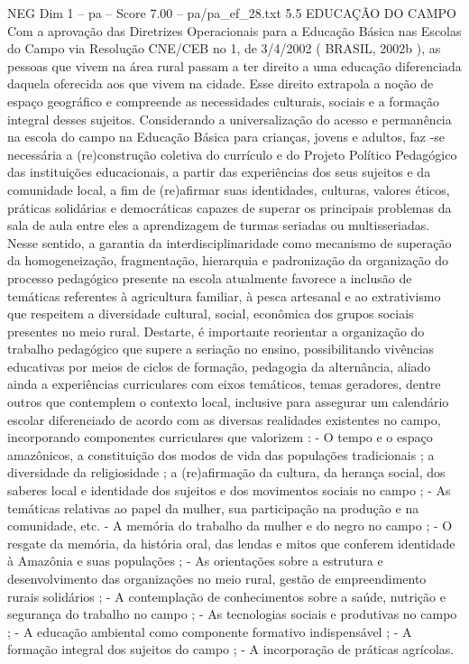 \begin{textsample}{NEG Dim 1 – pa – Score 7.00 – pa/pa\_ef\_28.txt}  \label{ex:f1_neg_260}
5.5 EDUCAÇÃO DO CAMPO Com a aprovação das Diretrizes Operacionais para a Educação Básica nas Escolas do Campo via Resolução CNE/CEB no 1, de 3/4/2002 ( BRASIL, 2002b ), as pessoas que vivem na área rural passam a ter direito a uma educação diferenciada daquela oferecida aos que vivem na cidade.
Esse direito extrapola a noção de espaço geográfico e compreende as necessidades culturais, sociais e a formação integral desses sujeitos.
Considerando a universalização do acesso e permanência na escola do campo na Educação Básica para crianças, jovens e adultos, faz -se necessária a (re)construção coletiva do currículo e do Projeto Político Pedagógico das instituições educacionais, a partir das experiências dos seus sujeitos e da comunidade local, a fim de (re)afirmar suas identidades, culturas, valores éticos, práticas solidárias e democráticas capazes de superar os principais problemas da sala de aula entre eles a aprendizagem de turmas seriadas ou multisseriadas.
Nesse sentido, a garantia da interdisciplinaridade como mecanismo de superação da homogeneização, fragmentação, hierarquia e padronização da organização do processo pedagógico presente na escola atualmente favorece a inclusão de temáticas referentes à agricultura familiar, à pesca artesanal e ao extrativismo que respeitem a diversidade cultural, social, econômica dos grupos sociais presentes no meio rural.
Destarte, é importante reorientar a organização do trabalho pedagógico que supere a seriação no ensino, possibilitando vivências educativas por meios de ciclos de formação, pedagogia da alternância, aliado ainda a experiências curriculares com eixos temáticos, temas geradores, dentre outros que contemplem o contexto local, inclusive para assegurar um calendário escolar diferenciado de acordo com as diversas realidades existentes no campo, incorporando componentes curriculares que valorizem : - O tempo e o espaço amazônicos, a constituição dos modos de vida das populações tradicionais ; a diversidade da religiosidade ; a (re)afirmação da cultura, da herança social, dos saberes local e identidade dos sujeitos e dos movimentos sociais no campo ; - As temáticas relativas ao papel da mulher, sua participação na produção e na comunidade, etc. - A memória do trabalho da mulher e do negro no campo ; - O resgate da memória, da história oral, das lendas e mitos que conferem identidade à Amazônia e suas populações ; - As orientações sobre a estrutura e desenvolvimento das organizações no meio rural, gestão de empreendimento rurais solidários ; - A contemplação de conhecimentos sobre a saúde, nutrição e segurança do trabalho no campo ; - As tecnologias sociais e produtivas no campo ; - A educação ambiental como componente formativo indispensável ; - A formação integral dos sujeitos do campo ; - A incorporação de práticas agrícolas.

\end{textsample}
